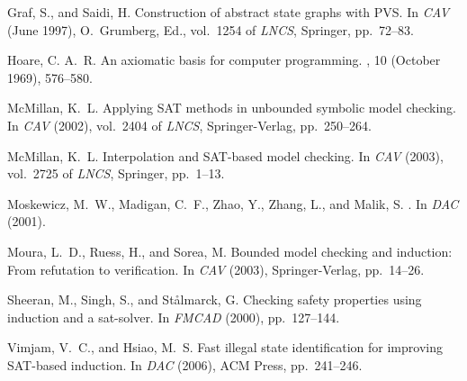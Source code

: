 \documentclass{llncs}
\begin{document}
\begin{thebibliography}{10}
{\sc Graf, S., and Saidi, H.}
\newblock Construction of abstract state graphs with {PVS}.
\newblock In {\em CAV\/} (June 1997), O.~Grumberg, Ed., vol.~1254 of {\em
  LNCS}, Springer, pp.~72--83.

{\sc Hoare, C. A.~R.}
\newblock An axiomatic basis for computer programming.
, 10 (October 1969), 576--580.

{\sc McMillan, K.~L.}
\newblock Applying {SAT} methods in unbounded symbolic model checking.
\newblock In {\em CAV\/} (2002), vol.~2404 of {\em LNCS}, Springer-Verlag,
  pp.~250--264.

{\sc McMillan, K.~L.}
\newblock Interpolation and {SAT}-based model checking.
\newblock In {\em CAV\/} (2003), vol.~2725 of {\em LNCS}, Springer, pp.~1--13.

{\sc Moskewicz, M.~W., Madigan, C.~F., Zhao, Y., Zhang, L., and Malik, S.}
.
\newblock In {\em DAC\/} (2001).

{\sc Moura, L.~D., Ruess, H., and Sorea, M.}
\newblock Bounded model checking and induction: From refutation to
  verification.
\newblock In {\em CAV\/} (2003), Springer-Verlag, pp.~14--26.

{\sc Sheeran, M., Singh, S., and St\r{a}lmarck, G.}
\newblock Checking safety properties using induction and a sat-solver.
\newblock In {\em FMCAD\/} (2000), pp.~127--144.

{\sc Vimjam, V.~C., and Hsiao, M.~S.}
\newblock Fast illegal state identification for improving {SAT}-based
  induction.
\newblock In {\em DAC\/} (2006), ACM Press, pp.~241--246.

\end{thebibliography}
\end{document}
